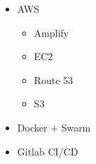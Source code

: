 \begin{itemize}
    \item AWS
    \begin{itemize}
        \item Amplify
        \item EC2
        \item Route 53
        \item S3
    \end{itemize} 
    \item Docker + Swarm
    \item Gitlab CI/CD
\end{itemize}